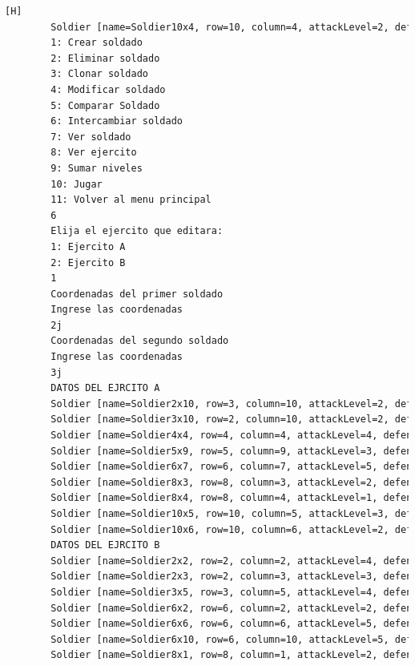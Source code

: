 \documentclass{article}
\begin{document}
\begin{lstlisting}[language=bash,caption={Compilando y probando el metodo exchangeSoldier  }][H]
		Soldier [name=Soldier10x4, row=10, column=4, attackLevel=2, defenseLevel=4, actualLife=3, speed=0, attitude=Repose, current=true]
		1: Crear soldado
		2: Eliminar soldado
		3: Clonar soldado
		4: Modificar soldado
		5: Comparar Soldado
		6: Intercambiar soldado
		7: Ver soldado
		8: Ver ejercito
		9: Sumar niveles
		10: Jugar
		11: Volver al menu principal
		6
		Elija el ejercito que editara:
		1: Ejercito A
		2: Ejercito B
		1
		Coordenadas del primer soldado
		Ingrese las coordenadas
		2j
		Coordenadas del segundo soldado
		Ingrese las coordenadas
		3j
		DATOS DEL EJRCITO A
		Soldier [name=Soldier2x10, row=3, column=10, attackLevel=2, defenseLevel=2, actualLife=2, speed=0, attitude=Repose, current=true]
		Soldier [name=Soldier3x10, row=2, column=10, attackLevel=2, defenseLevel=3, actualLife=2, speed=0, attitude=Repose, current=true]
		Soldier [name=Soldier4x4, row=4, column=4, attackLevel=4, defenseLevel=5, actualLife=3, speed=0, attitude=Repose, current=true]
		Soldier [name=Soldier5x9, row=5, column=9, attackLevel=3, defenseLevel=3, actualLife=2, speed=0, attitude=Repose, current=true]
		Soldier [name=Soldier6x7, row=6, column=7, attackLevel=5, defenseLevel=1, actualLife=4, speed=0, attitude=Repose, current=true]
		Soldier [name=Soldier8x3, row=8, column=3, attackLevel=2, defenseLevel=4, actualLife=5, speed=0, attitude=Repose, current=true]
		Soldier [name=Soldier8x4, row=8, column=4, attackLevel=1, defenseLevel=1, actualLife=2, speed=0, attitude=Repose, current=true]
		Soldier [name=Soldier10x5, row=10, column=5, attackLevel=3, defenseLevel=2, actualLife=5, speed=0, attitude=Repose, current=true]
		Soldier [name=Soldier10x6, row=10, column=6, attackLevel=2, defenseLevel=5, actualLife=4, speed=0, attitude=Repose, current=true]
		DATOS DEL EJRCITO B
		Soldier [name=Soldier2x2, row=2, column=2, attackLevel=4, defenseLevel=3, actualLife=3, speed=0, attitude=Repose, current=true]
		Soldier [name=Soldier2x3, row=2, column=3, attackLevel=3, defenseLevel=3, actualLife=3, speed=0, attitude=Repose, current=true]
		Soldier [name=Soldier3x5, row=3, column=5, attackLevel=4, defenseLevel=5, actualLife=1, speed=0, attitude=Repose, current=true]
		Soldier [name=Soldier6x2, row=6, column=2, attackLevel=2, defenseLevel=5, actualLife=4, speed=0, attitude=Repose, current=true]
		Soldier [name=Soldier6x6, row=6, column=6, attackLevel=5, defenseLevel=3, actualLife=3, speed=0, attitude=Repose, current=true]
		Soldier [name=Soldier6x10, row=6, column=10, attackLevel=5, defenseLevel=4, actualLife=1, speed=0, attitude=Repose, current=true]
		Soldier [name=Soldier8x1, row=8, column=1, attackLevel=2, defenseLevel=4, actualLife=4, speed=0, attitude=Repose, current=true]

\end{lstlisting}
\end{document}
